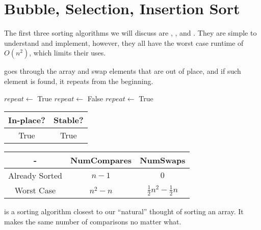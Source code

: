 \documentclass{report}
\begin{document}
\section{Bubble, Selection, Insertion Sort}

The first three sorting algorithms we will discuss are , , and . They are simple to understand and implement, however, they all have the worst case runtime of $O(n^{2})$, which limits their uses.

 goes through the array and swap elements that are out of place, and if such element is found, it repeats from the beginning.

\noindent \hrulefill
\begin{algorithmic}[1]
   
    \State $repeat \gets$ True
      \State $repeat \gets$ False
          \State {} 
          \State $repeat \gets$ True
        \EndIf
      \EndFor
    \EndWhile
    \State {}
  \EndFunction
\end{algorithmic}
\noindent \hrulefill

\begin{center}
  \begin{tabular}{ | c | c | }
    \hline
    In-place? & Stable? \\
    \hline
    True & True \\
    \hline
  \end{tabular}
\end{center}

\begin{center}
  \begin{tabular}{ | c | c | c | }
    \hline
    - & NumCompares & NumSwaps \\
    \hline
    Already Sorted & $n - 1$ & $0$ \\
    \hline
    Worst Case & $n^{2} - n$ & $\frac{1}{2} n^{2} - \frac{1}{2} n$ \\
    \hline
  \end{tabular}
\end{center}

 is a sorting algorithm closest to our ``natural'' thought of sorting an array. It makes the same number of comparisons no matter what.
\end{document}
